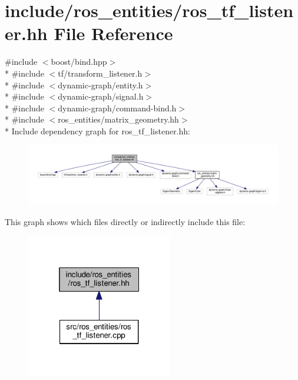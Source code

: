 \hypertarget{ros__tf__listener_8hh}{}\section{include/ros\+\_\+entities/ros\+\_\+tf\+\_\+listener.hh File Reference}
\label{ros__tf__listener_8hh}
{\ttfamily \#include $<$boost/bind.\+hpp$>$}\\*
{\ttfamily \#include $<$tf/transform\+\_\+listener.\+h$>$}\\*
{\ttfamily \#include $<$dynamic-\/graph/entity.\+h$>$}\\*
{\ttfamily \#include $<$dynamic-\/graph/signal.\+h$>$}\\*
{\ttfamily \#include $<$dynamic-\/graph/command-\/bind.\+h$>$}\\*
{\ttfamily \#include $<$ros\+\_\+entities/matrix\+\_\+geometry.\+hh$>$}\\*
Include dependency graph for ros\+\_\+tf\+\_\+listener.\+hh\+:
\nopagebreak
\begin{figure}[H]
\begin{center}
\leavevmode
\includegraphics[width=350pt]{ros__tf__listener_8hh__incl}
\end{center}
\end{figure}
This graph shows which files directly or indirectly include this file\+:
\nopagebreak
\begin{figure}[H]
\begin{center}
\leavevmode
\includegraphics[width=181pt]{ros__tf__listener_8hh__dep__incl}
\end{center}
\end{figure}
